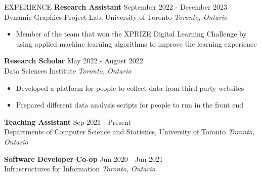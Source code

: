 \documentclass{resume} %
\begin{document}
\begin{rSection}{EXPERIENCE}
    \textbf{Research Assistant} \hfill September 2022 - December 2023\\Dynamic Graphics Project Lab, University of Toronto \hfill \textit{Toronto, Ontario}
    \begin{itemize}
        \itemsep -3pt {} 
        \item Member of the team that won the XPRIZE Digital Learning Challenge by using applied machine learning algorithms to improve the learning experience
    \end{itemize}

    \textbf{Research Scholar} \hfill May 2022 - August 2022\\Data Sciences Institute \hfill \textit{Toronto, Ontario}
    \begin{itemize}
        \itemsep -3pt {} 
        \item Developed a platform for people to collect data from third-party websites
        \item Prepared different data analysis scripts for people to run in the front end
    \end{itemize}

 
    \textbf{Teaching Assistant} \hfill Sep 2021 - Present\\Departments of Computer Science and Statistics, University of Toronto \hfill \textit{Toronto, Ontario}
    
    \textbf{Software Developer Co-op} \hfill Jun 2020 - Jun 2021\\Infrastructures for Information \hfill \textit{Toronto, Ontario}

\end{rSection} 

\end{document}
